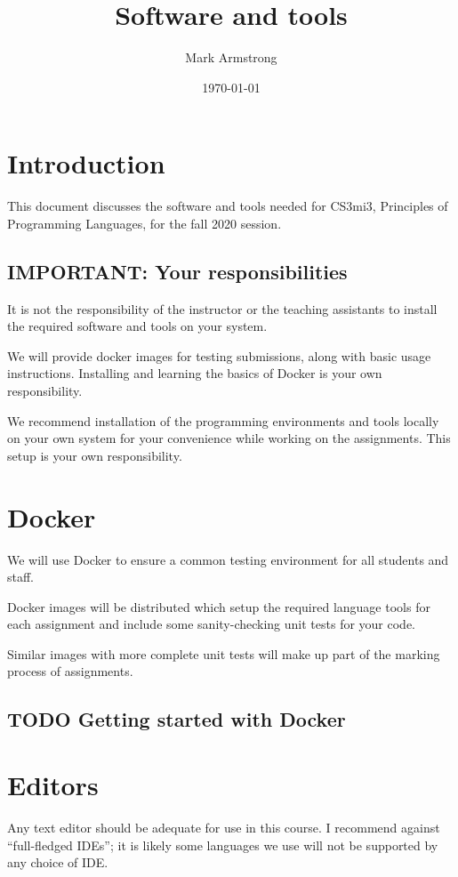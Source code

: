 \documentclass[11pt]{article}
\author{Mark Armstrong}
\date{\today}
\title{Software and tools}
\begin{document}
\maketitle
\tableofcontents


\section{Introduction}
\label{sec:orgc17859b}
This document discusses the software and tools needed
for CS3mi3, Principles of Programming Languages, for the fall 2020 session.

\subsection{\textbf{IMPORTANT}: Your responsibilities}
\label{sec:orgbbe43a6}
\begin{center}
It is not the responsibility of the instructor or the teaching assistants
to install the required software and tools on your system.

We will provide docker images for testing submissions, along with
basic usage instructions.
Installing and learning the basics of Docker is your own responsibility.

We recommend installation of the programming environments and tools
locally on your own system for your convenience
while working on the assignments.
This setup is your own responsibility.
\end{center}

\section{Docker}
\label{sec:orgc07623f}
We will use Docker to ensure a common testing environment
for all students and staff.

Docker images will be distributed which setup the required
language tools for each assignment and include some sanity-checking
unit tests for your code.

Similar images with more complete unit tests will make up part
of the marking process of assignments.

\subsection{{\bfseries\sffamily TODO} Getting started with Docker}
\label{sec:org7cf83bb}

\section{Editors}
\label{sec:orga9e7128}
Any text editor should be adequate for use in this course.
I recommend against “full-fledged IDEs”; it is likely
some languages we use will not be supported by any choice of IDE.
\end{document}
